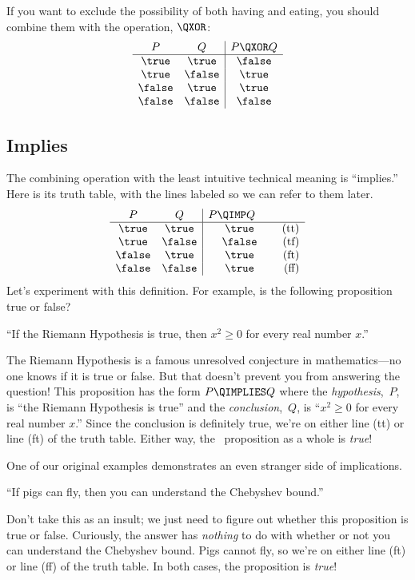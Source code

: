 If you want to exclude the possibility of both having and eating, you
should combine them with the  operation, $\QXOR$:
%
\[\begin{array}{cc|c}
P & Q & P \QXOR Q \\ \hline
\true & \true & \false \\
\true & \false & \true \\
\false & \true & \true \\
\false & \false & \false
\end{array}
\]
%

\subsection{Implies}

The combining operation with the least intuitive technical meaning is
``implies.''  Here is its truth table, with the lines labeled so we can
refer to them later.
%
\[
\begin{array}{cc|cr}
    P  &   Q    & \parbox[b]{13ex}{$P \QIMP Q$} \\ \hline
\true  & \true  & \true & \text{(tt)}\\
\true  & \false & \false  & \text{(tf)}\\
\false & \true  & \true  & \text{(ft)}\\
\false & \false & \true  & \text{(ff)}
\end{array}
\]
Let's experiment with this definition.  For example, is the following
proposition true or false?
\begin{center}
``If the Riemann Hypothesis is true, then $x^2 \geq 0$ for every real
number $x$.''
\end{center}
The Riemann Hypothesis is a famous unresolved conjecture in
mathematics---no one knows if it is true or false.  But that doesn't
prevent you from answering the question!  This proposition has the form $P
\QIMPLIES Q$ where the \emph{hypothesis},~$P$, is ``the Riemann Hypothesis
is true'' and the \emph{conclusion},~$Q$, is ``$x^2 \geq 0$ for every real
number $x$.''  Since the conclusion is definitely true, we're on either
line (tt) or line (ft) of the truth table.  Either way, the \QIMP\
proposition as a whole is \emph{true}!

One of our original examples demonstrates an even stranger side of
implications.
\begin{center}
``If pigs can fly, then you can understand the Chebyshev bound.''
\end{center}
Don't take this as an insult; we just need to figure out whether this
proposition is true or false.  Curiously, the answer has
\emph{nothing} to do with whether or not you can understand the
Chebyshev bound.  Pigs cannot fly, so we're on either line (ft) or
line (ff) of the truth table.  In both cases, the proposition is
\emph{true}!

